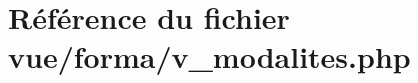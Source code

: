 \hypertarget{v__modalites_8php}{}\section{Référence du fichier vue/forma/v\+\_\+modalites.php}
\label{v__modalites_8php}
